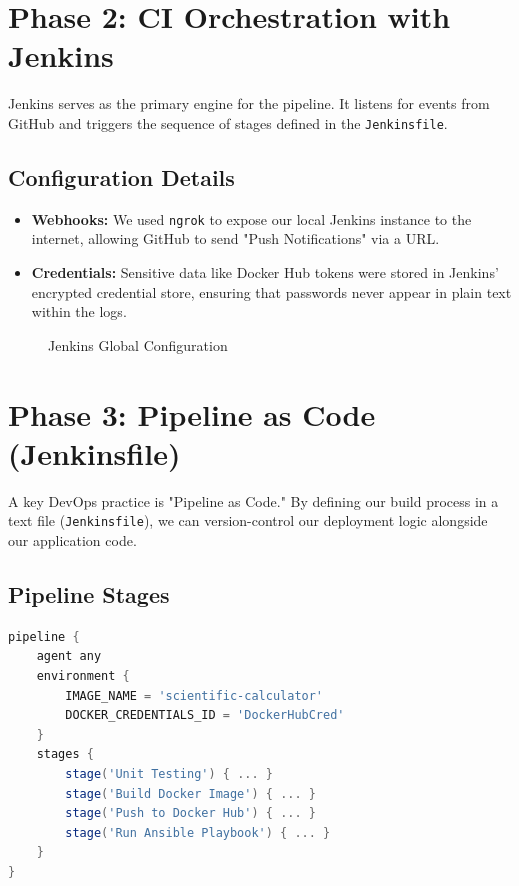 \documentclass[12pt]{article}
\begin{document}
\section{Phase 2: CI Orchestration with Jenkins}
Jenkins serves as the primary engine for the pipeline. It listens for events from GitHub and triggers the sequence of stages defined in the \texttt{Jenkinsfile}.

\subsection{Configuration Details}
\begin{itemize}
    \item \textbf{Webhooks:} We used \texttt{ngrok} to expose our local Jenkins instance to the internet, allowing GitHub to send "Push Notifications" via a URL.
    \item \textbf{Credentials:} Sensitive data like Docker Hub tokens were stored in Jenkins' encrypted credential store, ensuring that passwords never appear in plain text within the logs.
\end{itemize}

\vspace{1cm}
\begin{figure}[h]
    \centering
    \caption{Jenkins Global Configuration}
\end{figure}

\section{Phase 3: Pipeline as Code (Jenkinsfile)}
A key DevOps practice is "Pipeline as Code." By defining our build process in a text file (\texttt{Jenkinsfile}), we can version-control our deployment logic alongside our application code.

\subsection{Pipeline Stages}
\begin{lstlisting}[language=Groovy, caption=Declarative Jenkinsfile Structure]
pipeline {
    agent any
    environment {
        IMAGE_NAME = 'scientific-calculator'
        DOCKER_CREDENTIALS_ID = 'DockerHubCred'
    }
    stages {
        stage('Unit Testing') { ... }
        stage('Build Docker Image') { ... }
        stage('Push to Docker Hub') { ... }
        stage('Run Ansible Playbook') { ... }
    }
}
\end{lstlisting}
\end{document}
